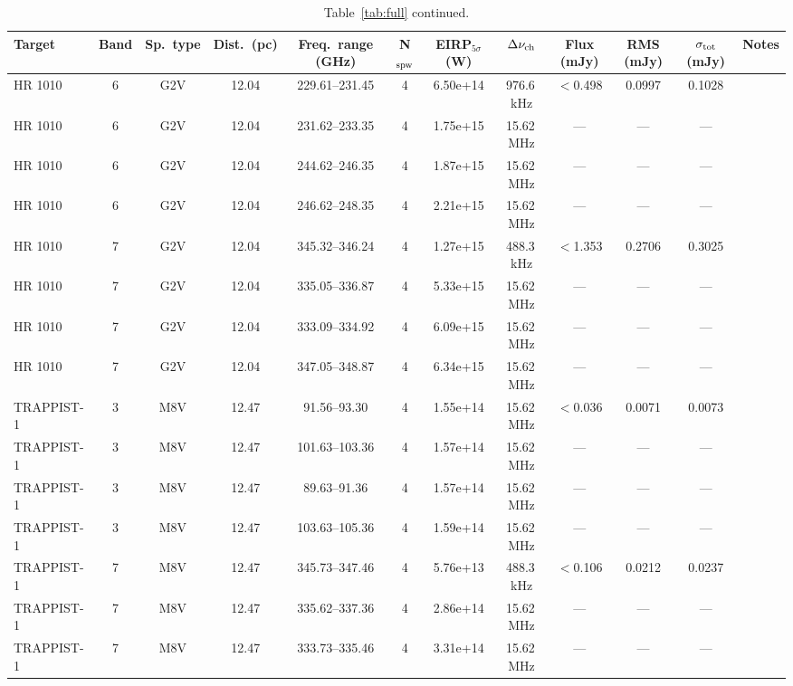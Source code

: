 \documentclass{openjournal}
\begin{document}
\begin{table}
\centering
\scriptsize
\setlength{\tabcolsep}{2pt}
\caption{Table~\ref{tab:full} continued.}
\label{tab:full5}
\begin{tabularx}{\textwidth}{@{}l c c c c c c c c c c X@{}}
\hline
Target & Band & Sp.\ type & Dist.\ (pc) & Freq.\ range (GHz) & N$_{\rm spw}$ & EIRP$_{5\sigma}$ (W) & $\Delta\nu_{\rm ch}$ & Flux (mJy) & RMS (mJy) & $\sigma_{\rm tot}$ (mJy) & Notes \\
\hline
 HR 1010 & 6 & G2V & 12.04 & 229.61--231.45 & 4 & 6.50e+14 & 976.6\,kHz & $<$0.498 & 0.0997 & 0.1028 &  \\
 HR 1010 & 6 & G2V & 12.04 & 231.62--233.35 & 4 & 1.75e+15 & 15.62\,MHz & --- & --- & --- &  \\
 HR 1010 & 6 & G2V & 12.04 & 244.62--246.35 & 4 & 1.87e+15 & 15.62\,MHz & --- & --- & --- &  \\
 HR 1010 & 6 & G2V & 12.04 & 246.62--248.35 & 4 & 2.21e+15 & 15.62\,MHz & --- & --- & --- &  \\
 HR 1010 & 7 & G2V & 12.04 & 345.32--346.24 & 4 & 1.27e+15 & 488.3\,kHz & $<$1.353 & 0.2706 & 0.3025 &  \\
 HR 1010 & 7 & G2V & 12.04 & 335.05--336.87 & 4 & 5.33e+15 & 15.62\,MHz & --- & --- & --- &  \\
 HR 1010 & 7 & G2V & 12.04 & 333.09--334.92 & 4 & 6.09e+15 & 15.62\,MHz & --- & --- & --- &  \\
 HR 1010 & 7 & G2V & 12.04 & 347.05--348.87 & 4 & 6.34e+15 & 15.62\,MHz & --- & --- & --- &  \\
 TRAPPIST-1 & 3 & M8V & 12.47 & 91.56--93.30 & 4 & 1.55e+14 & 15.62\,MHz & $<$0.036 & 0.0071 & 0.0073 &  \\
 TRAPPIST-1 & 3 & M8V & 12.47 & 101.63--103.36 & 4 & 1.57e+14 & 15.62\,MHz & --- & --- & --- &  \\
 TRAPPIST-1 & 3 & M8V & 12.47 & 89.63--91.36 & 4 & 1.57e+14 & 15.62\,MHz & --- & --- & --- &  \\
 TRAPPIST-1 & 3 & M8V & 12.47 & 103.63--105.36 & 4 & 1.59e+14 & 15.62\,MHz & --- & --- & --- &  \\
 TRAPPIST-1 & 7 & M8V & 12.47 & 345.73--347.46 & 4 & 5.76e+13 & 488.3\,kHz & $<$0.106 & 0.0212 & 0.0237 &  \\
 TRAPPIST-1 & 7 & M8V & 12.47 & 335.62--337.36 & 4 & 2.86e+14 & 15.62\,MHz & --- & --- & --- &  \\
 TRAPPIST-1 & 7 & M8V & 12.47 & 333.73--335.46 & 4 & 3.31e+14 & 15.62\,MHz & --- & --- & --- &  \\

\end{tabularx}
\end{table}
\end{document}

